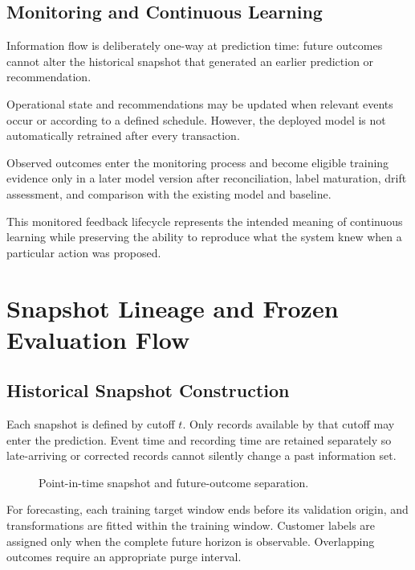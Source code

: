 \documentclass[a4paper,11pt,oneside]{book}
\theoremstyle{plain}
\theoremstyle{definition}
\theoremstyle{remark}
\begin{document}
\subsection{Monitoring and Continuous Learning}

Information flow is deliberately one-way at prediction time: future outcomes
cannot alter the historical snapshot that generated an earlier prediction or
recommendation.

Operational state and recommendations may be updated when relevant events occur
or according to a defined schedule. However, the deployed model is not automatically
retrained after every transaction.

Observed outcomes enter the monitoring process and become eligible training
evidence only in a later model version after reconciliation, label maturation,
drift assessment, and comparison with the existing model and baseline.

This monitored feedback lifecycle represents the intended meaning of continuous
learning while preserving the ability to reproduce what the system knew when a
particular action was proposed.


\section{Snapshot Lineage and Frozen Evaluation Flow}
\label{sec:snapshot_lineage}

\subsection{Historical Snapshot Construction}
Each snapshot is defined by cutoff \(t\). Only records available by that
cutoff may enter the prediction. Event time and recording time are retained
separately so late-arriving or corrected records cannot silently change a
past information set.

\begin{figure}[H]
\centering
{}
\caption{Point-in-time snapshot and future-outcome separation.}
\label{fig:snapshot_flow}
\end{figure}
For forecasting, each training target window ends before its validation
origin, and transformations are fitted within the training window. Customer
labels are assigned only when the complete future horizon is observable.
Overlapping outcomes require an appropriate purge interval.
\end{document}

